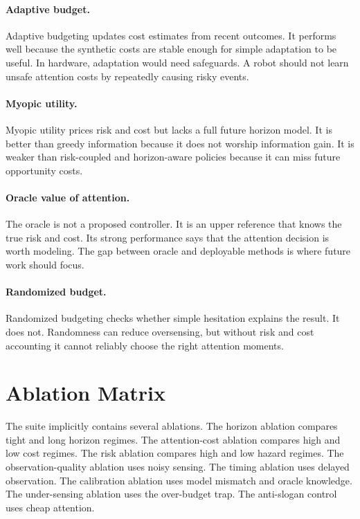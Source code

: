 \documentclass{article}
\begin{document}
\paragraph{Adaptive budget.}
Adaptive budgeting updates cost estimates from recent outcomes. It performs
well because the synthetic costs are stable enough for simple adaptation to be
useful. In hardware, adaptation would need safeguards. A robot should not
learn unsafe attention costs by repeatedly causing risky events.

\paragraph{Myopic utility.}
Myopic utility prices risk and cost but lacks a full future horizon model. It
is better than greedy information because it does not worship information gain.
It is weaker than risk-coupled and horizon-aware policies because it can miss
future opportunity costs.

\paragraph{Oracle value of attention.}
The oracle is not a proposed controller. It is an upper reference that knows
the true risk and cost. Its strong performance says that the attention decision
is worth modeling. The gap between oracle and deployable methods is where
future work should focus.

\paragraph{Randomized budget.}
Randomized budgeting checks whether simple hesitation explains the result. It
does not. Randomness can reduce oversensing, but without risk and cost
accounting it cannot reliably choose the right attention moments.

\section{Ablation Matrix}

The suite implicitly contains several ablations. The horizon ablation compares
tight and long horizon regimes. The attention-cost ablation compares high and
low cost regimes. The risk ablation compares high and low hazard regimes. The
observation-quality ablation uses noisy sensing. The timing ablation uses
delayed observation. The calibration ablation uses model mismatch and oracle
knowledge. The under-sensing ablation uses the over-budget trap. The
anti-slogan control uses cheap attention.
\end{document}
